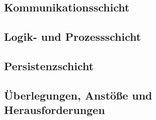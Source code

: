     \subsection{Kommunikationsschicht}


    \subsection{Logik- und Prozessschicht}

    \subsection*{Persistenzschicht}


    \subsection{Überlegungen, Anstöße und Herausforderungen}

